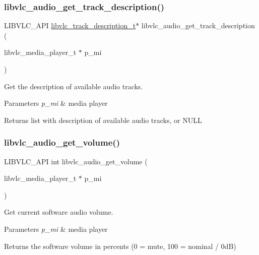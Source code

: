 \subsubsection{\texorpdfstring{libvlc\+\_\+audio\+\_\+get\+\_\+track\+\_\+description()}{libvlc\_audio\_get\_track\_description()}}
{\footnotesize\ttfamily L\+I\+B\+V\+L\+C\+\_\+\+A\+PI \hyperlink{structlibvlc__track__description__t}{libvlc\+\_\+track\+\_\+description\+\_\+t}$\ast$ libvlc\+\_\+audio\+\_\+get\+\_\+track\+\_\+description (\begin{DoxyParamCaption}\item[{libvlc\+\_\+media\+\_\+player\+\_\+t $\ast$}]{p\+\_\+mi }\end{DoxyParamCaption})}

Get the description of available audio tracks.


\begin{DoxyParams}{Parameters}
{\em p\+\_\+mi} & media player \\
\hline
\end{DoxyParams}
\begin{DoxyReturn}{Returns}
list with description of available audio tracks, or N\+U\+LL 
\end{DoxyReturn}
\mbox{\label{group__libvlc__audio_ga73a9fef5a0614659261c2d8f1d29b3b7}} 
\subsubsection{\texorpdfstring{libvlc\+\_\+audio\+\_\+get\+\_\+volume()}{libvlc\_audio\_get\_volume()}}
{\footnotesize\ttfamily L\+I\+B\+V\+L\+C\+\_\+\+A\+PI int libvlc\+\_\+audio\+\_\+get\+\_\+volume (\begin{DoxyParamCaption}\item[{libvlc\+\_\+media\+\_\+player\+\_\+t $\ast$}]{p\+\_\+mi }\end{DoxyParamCaption})}

Get current software audio volume.


\begin{DoxyParams}{Parameters}
{\em p\+\_\+mi} & media player \\
\hline
\end{DoxyParams}
\begin{DoxyReturn}{Returns}
the software volume in percents (0 = mute, 100 = nominal / 0dB) 
\end{DoxyReturn}
\mbox{\label{group__libvlc__audio_gaa1ed7a231ff2020d60152c235f15f4cf}} 
